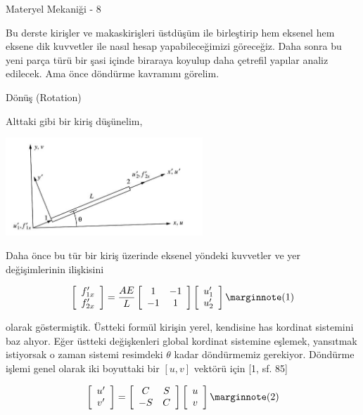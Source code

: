 \documentclass[12pt,fleqn]{article}\usepackage{../../common}
\begin{document}
Materyel Mekaniği - 8

Bu derste kirişler ve makaskirişleri üstdüşüm ile birleştirip hem eksenel hem
eksene dik kuvvetler ile nasıl hesap yapabileceğimizi göreceğiz. Daha sonra bu
yeni parça türü bir şasi içinde biraraya koyulup daha çetrefil yapılar analiz
edilecek. Ama önce döndürme kavramını görelim.

Dönüş (Rotation)

Alttaki gibi bir kiriş düşünelim,

\includegraphics[width=20em]{phy_020_strs_06_01.jpg}

Daha önce bu tür bir kiriş üzerinde eksenel yöndeki kuvvetler ve yer
değişimlerinin ilişkisini

$$
\left[\begin{array}{c}
f'_{1x} \\ f'_{2x}
\end{array}\right] =
\frac{AE}{L}
\left[\begin{array}{cc}
1 & -1 \\ -1 & 1
\end{array}\right]
\left[\begin{array}{c}
u'_1 \\ u'_2
\end{array}\right]
\mlabel{1}
$$

olarak göstermiştik. Üstteki formül kirişin yerel, kendisine has kordinat
sistemini baz alıyor. Eğer üstteki değişkenleri global kordinat sistemine
eşlemek, yansıtmak istiyorsak o zaman sistemi resimdeki $\theta$ kadar döndürmemiz
gerekiyor. Döndürme işlemi genel olarak iki boyuttaki bir $[u, v]$ vektörü için
[1, sf. 85]

$$
\left[\begin{array}{c}
u' \\ v'
\end{array}\right] =
\left[\begin{array}{cc}
C & S \\ -S & C
\end{array}\right]
\left[\begin{array}{c}
u \\ v
\end{array}\right]
\mlabel{2}
$$
\end{document}
